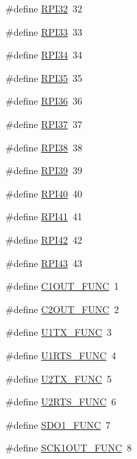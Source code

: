 \begin{DoxyCompactItemize}
\#define \hyperlink{pps-macro_8h_a894761e0a70976cf879492a19bc9a352}{R\+P\+I32}~32
\item 
\#define \hyperlink{pps-macro_8h_a6778bd0ed8894d871300ad0e7ee245c5}{R\+P\+I33}~33
\item 
\#define \hyperlink{pps-macro_8h_a44f7b58e23056808edfc9e74fee91fd7}{R\+P\+I34}~34
\item 
\#define \hyperlink{pps-macro_8h_a3ade09c0c466510204e5f62ca356b7c5}{R\+P\+I35}~35
\item 
\#define \hyperlink{pps-macro_8h_adcfb940538d64a022f788d6fa7b98b05}{R\+P\+I36}~36
\item 
\#define \hyperlink{pps-macro_8h_af998323f403afaa1f1ec2e0ca9353a31}{R\+P\+I37}~37
\item 
\#define \hyperlink{pps-macro_8h_aafd64f5c6d9a5270a9e150da54aab911}{R\+P\+I38}~38
\item 
\#define \hyperlink{pps-macro_8h_a0ca808dce8e0c6370593639993234a7c}{R\+P\+I39}~39
\item 
\#define \hyperlink{pps-macro_8h_a4b32c589078f313c9763eadbd7cf5061}{R\+P\+I40}~40
\item 
\#define \hyperlink{pps-macro_8h_a174ec4b355e8b2cd35b9b7ac50e89f2c}{R\+P\+I41}~41
\item 
\#define \hyperlink{pps-macro_8h_a241ff5b1c9997874ed443a6b9e0b0e16}{R\+P\+I42}~42
\item 
\#define \hyperlink{pps-macro_8h_a65f47a3314bc470f6f797b336804c595}{R\+P\+I43}~43
\item 
\#define \hyperlink{pps-macro_8h_afee8c7a5f7dbdfcd814fb517eed618ee}{C1\+O\+U\+T\+\_\+\+F\+U\+N\+C}~1
\item 
\#define \hyperlink{pps-macro_8h_a74ee150ca07ebf965bececf08ac9102a}{C2\+O\+U\+T\+\_\+\+F\+U\+N\+C}~2
\item 
\#define \hyperlink{pps-macro_8h_a2292fcf23da81bb46fbe6cfe37c0d071}{U1\+T\+X\+\_\+\+F\+U\+N\+C}~3
\item 
\#define \hyperlink{pps-macro_8h_a86f7c4fcf36e022fae9045ef369c49a1}{U1\+R\+T\+S\+\_\+\+F\+U\+N\+C}~4
\item 
\#define \hyperlink{pps-macro_8h_aedfc30fea10a244d35e993a18270aae5}{U2\+T\+X\+\_\+\+F\+U\+N\+C}~5
\item 
\#define \hyperlink{pps-macro_8h_ad38ab81c0344617b73a0e7da86bec66b}{U2\+R\+T\+S\+\_\+\+F\+U\+N\+C}~6
\item 
\#define \hyperlink{pps-macro_8h_a10d9a7902717b270c1d262571bf2f6a4}{S\+D\+O1\+\_\+\+F\+U\+N\+C}~7
\item 
\#define \hyperlink{pps-macro_8h_a6e4371be306e0de3f80875f59f74c088}{S\+C\+K1\+O\+U\+T\+\_\+\+F\+U\+N\+C}~8

\end{DoxyCompactItemize}
